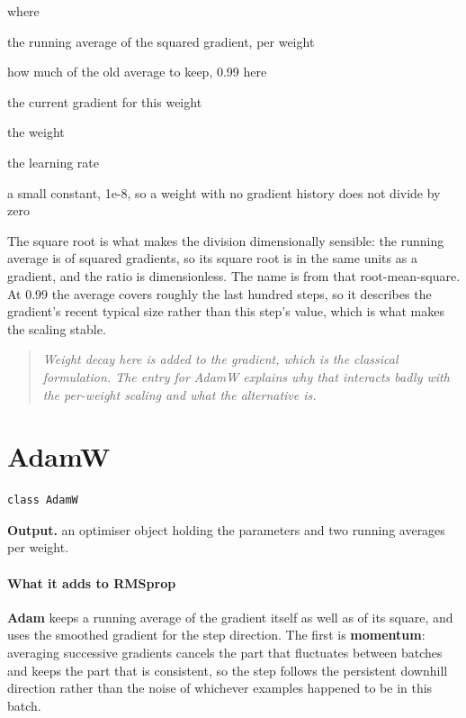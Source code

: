 \noindent where
\begin{description}[leftmargin=2.4em,style=nextline,font=\normalfont\ttfamily]\setlength\itemsep{1pt}
  \item[{$v$}] \normalfont the running average of the squared gradient, per weight
  \item[{$\alpha$}] \normalfont how much of the old average to keep, 0.99 here
  \item[{$g$}] \normalfont the current gradient for this weight
  \item[{$w$}] \normalfont the weight
  \item[{$\eta$}] \normalfont the learning rate
  \item[{$\epsilon$}] \normalfont a small constant, 1e-8, so a weight with no gradient history does not divide by zero
\end{description}
The square root is what makes the division dimensionally sensible: the running average is of squared gradients, so its square root is in the same units as a gradient, and the ratio is dimensionless. The name is from that root-mean-square. At 0.99 the average covers roughly the last hundred steps, so it describes the gradient's recent typical size rather than this step's value, which is what makes the scaling stable.


\begin{quote}\small\itshape Weight decay here is added to the gradient, which is the classical formulation. The entry for AdamW explains why that interacts badly with the per-weight scaling and what the alternative is.\end{quote}

\section{AdamW}
\begin{lstlisting}[style=sig]
class AdamW
\end{lstlisting}

\noindent\textbf{Output.} an optimiser object holding the parameters and two running averages per weight.


\paragraph{What it adds to RMSprop}
\textbf{Adam} \cite{kingma2015} keeps a running average of the gradient itself as well as of its square, and uses the smoothed gradient for the step direction. The first is \textbf{momentum}: averaging successive gradients cancels the part that fluctuates between batches and keeps the part that is consistent, so the step follows the persistent downhill direction rather than the noise of whichever examples happened to be in this batch.


